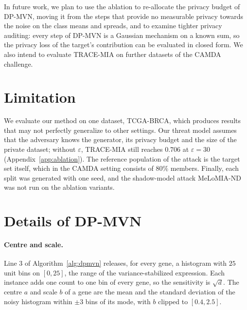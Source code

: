 \documentclass{article}
\newcommand{\dpmvn}{DP-MVN}
\newcommand{\ours}{TRACE-MIA}
\begin{document}
In future work, we plan to use the ablation to re-allocate the privacy budget of \dpmvn{}, moving it from the steps that provide no measurable privacy towards the noise on the class means and spreads, and to examine tighter privacy auditing: every step of \dpmvn{} is a Gaussian mechanism on a known sum, so the privacy loss of the target's contribution can be evaluated in closed form. We also intend to evaluate \ours{} on further datasets of the CAMDA challenge.

\section*{Limitation}
We evaluate our method on one dataset, TCGA-BRCA, which produces results that may not perfectly generalize to other settings. Our threat model assumes that the adversary knows the generator, its privacy budget and the size of the private dataset; without $\varepsilon$, \ours{} still reaches $0.706$ at $\varepsilon=30$ (Appendix~\ref{app:ablation}). The reference population of the attack is the target set itself, which in the CAMDA setting consists of $80\%$ members. Finally, each split was generated with one seed, and the shadow-model attack MeLoMIA-ND was not run on the ablation variants.


\newpage




\newpage
\appendix

\section{Details of \dpmvn{}}
\label{app:dpmvn}

\paragraph{Centre and scale.}
Line 3 of Algorithm~\ref{alg:dpmvn} releases, for every gene, a histogram with $25$ unit bins on $[0,25]$, the range of the variance-stabilized expression. Each instance adds one count to one bin of every gene, so the sensitivity is $\sqrt d$. The centre $a$ and scale $b$ of a gene are the mean and the standard deviation of the noisy histogram within $\pm3$ bins of its mode, with $b$ clipped to $[0.4, 2.5]$.
\end{document}
